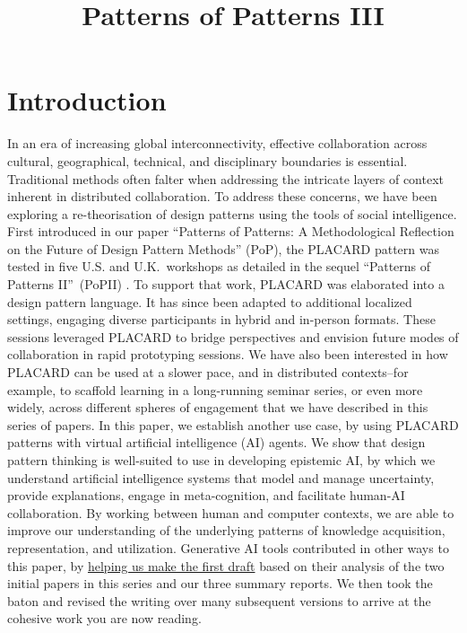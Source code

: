\documentclass[acmlarge,timestamp]{acmart}
\date{}
\title{Patterns of Patterns III}
\begin{document}



\section{Introduction}\label{sec:intro}

In an era of increasing global interconnectivity, effective
collaboration across cultural, geographical, technical, and
disciplinary boundaries is essential. Traditional methods often falter
when addressing the intricate layers of context inherent in
distributed collaboration.  To address these concerns, we have been
exploring a re-theorisation of design patterns using the tools of
social intelligence.  First introduced in our paper “Patterns of
Patterns: A Methodological Reflection on the Future of Design Pattern
Methods” (PoP), the PLACARD pattern was tested in five U.S. and
U.K.~workshops as detailed in the sequel “Patterns of Patterns
II”~(PoPII) \cite{10.5555/3712039.3712044,10.5555/3721041.3721050}.
To support that work, PLACARD was elaborated into a design pattern
language.  It has since been adapted to additional localized settings,
engaging diverse participants in hybrid and in-person formats. These
sessions leveraged PLACARD to bridge perspectives and envision future
modes of collaboration in rapid prototyping sessions.  We have also
been interested in how PLACARD can be used at a slower pace, and in
distributed contexts--for example, to scaffold learning in a
long-running seminar series, or even more widely, across different
spheres of engagement that we have described in this series of papers.
In this paper, we establish another use case, by using PLACARD
patterns with virtual artificial intelligence (AI) agents.  We show
that design pattern thinking is well-suited to use in developing
epistemic AI, by which we understand artificial intelligence systems
that model and manage uncertainty, provide explanations, engage in
meta-cognition, and facilitate human-AI collaboration. By working
between human and computer contexts, we are able to improve our
understanding of the underlying patterns of knowledge acquisition,
representation, and utilization.  Generative AI tools contributed in
other ways to this paper, by
\href{https://www.google.com/url?q=https://groups.google.com/g/peeragogy/c/XM7RKMDdcT4\&sa=D\&source=editors\&ust=1749305683239949\&usg=AOvVaw1GJKEDppYQy3WrqXEi9SV9}{helping us make the first draft} based on their analysis of the two
initial papers in this series and our three summary reports. We then
took the baton and revised the writing over many subsequent versions
to arrive at the cohesive work you are now reading.
\end{document}
